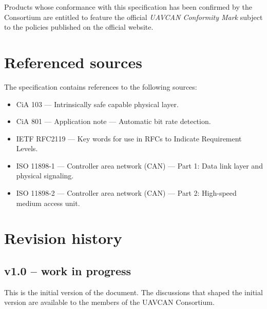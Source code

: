 Products whose conformance with this specification has been confirmed by the Consortium
are entitled to feature the official \emph{UAVCAN Conformity Mark}
subject to the policies published on the official website.

\section{Referenced sources}

The specification contains references to the following sources:

\begin{itemize}
    \item CiA 103 --- Intrinsically safe capable physical layer.
    \item CiA 801 --- Application note --- Automatic bit rate detection.

    \item IETF RFC2119 --- Key words for use in RFCs to Indicate Requirement Levels.

    \item ISO 11898-1 --- Controller area network (CAN) --- Part 1: Data link layer and physical signaling.
    \item ISO 11898-2 --- Controller area network (CAN) --- Part 2: High-speed medium access unit.
\end{itemize}

\section{Revision history}

\subsection{v1.0 -- work in progress}

This is the initial version of the document.
The discussions that shaped the initial version are available to the members of the UAVCAN Consortium.
